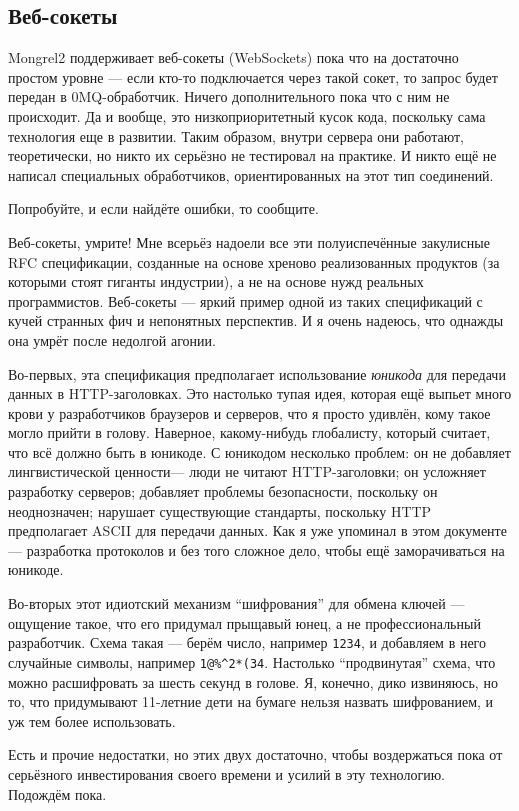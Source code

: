 \subsection{Веб-сокеты}

Mongrel2 поддерживает веб-сокеты (WebSockets) пока что на достаточно простом
уровне --- если кто-то подключается через такой сокет, то запрос будет передан в
0MQ-обработчик.  Ничего дополнительного пока что с ним не происходит. Да и
вообще, это низкоприоритетный кусок кода, поскольку сама технология еще в
развитии. Таким образом, внутри сервера они работают, теоретически, но никто их
серьёзно не тестировал на практике. И никто ещё не написал специальных
обработчиков, ориентированных на этот тип соединений.

Попробуйте, и если найдёте ошибки, то сообщите.

\begin{aside}{Веб-сокеты, умрите!}
Мне всерьёз надоели все эти полуиспечённые закулисные RFC спецификации,
созданные на основе хреново реализованных продуктов (за которыми стоят гиганты
индустрии), а не на основе нужд реальных программистов. Веб-сокеты --- яркий
пример одной из таких спецификаций с кучей странных фич и непонятных перспектив.
И я очень надеюсь, что однажды она умрёт после недолгой агонии.

Во-первых, эта спецификация предполагает использование \emph{юникода} для
передачи данных в HTTP-заголовках. Это настолько тупая идея, которая ещё выпьет
много крови у разработчиков браузеров и серверов, что я просто удивлён, кому
такое могло прийти в голову. Наверное, какому-нибудь глобалисту, который
считает, что всё должно быть в юникоде. С юникодом несколько проблем: он не
добавляет лингвистической ценности--- люди не читают HTTP-заголовки; он
усложняет разработку серверов; добавляет проблемы безопасности, поскольку он
неоднозначен; нарушает существующие стандарты, поскольку HTTP предполагает ASCII
для передачи данных. Как я уже упоминал в этом документе --- разработка
протоколов и без того сложное дело, чтобы ещё заморачиваться на юникоде.

Во-вторых этот идиотский механизм ``шифрования'' для обмена ключей --- ощущение
такое, что его придумал прыщавый юнец, а не профессиональный разработчик. Схема
такая --- берём число, например \verb|1234|, и добавляем в него случайные
символы, например \verb|1@%^2*(34|. Настолько ``продвинутая'' схема, что можно
расшифровать за шесть секунд в голове. Я, конечно, дико извиняюсь, но то, что
придумывают 11-летние дети на бумаге нельзя назвать шифрованием, и уж тем более
использовать.

Есть и прочие недостатки, но этих двух достаточно, чтобы воздержаться пока от
серьёзного инвестирования своего времени и усилий в эту технологию. Подождём
пока.
\end{aside}

